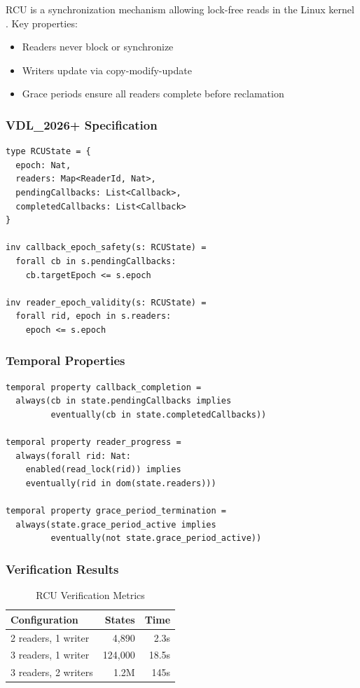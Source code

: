 \documentclass[conference]{IEEEtran}
\begin{document}
RCU is a synchronization mechanism allowing lock-free reads in the Linux kernel \cite{mckenney2013}. Key properties:
\begin{itemize}
\item Readers never block or synchronize
\item Writers update via copy-modify-update
\item Grace periods ensure all readers complete before reclamation
\end{itemize}

\subsubsection{VDL\_2026+ Specification}

\begin{lstlisting}[caption={RCU core types and invariants}]
type RCUState = {
  epoch: Nat,
  readers: Map<ReaderId, Nat>,
  pendingCallbacks: List<Callback>,
  completedCallbacks: List<Callback>
}

inv callback_epoch_safety(s: RCUState) =
  forall cb in s.pendingCallbacks:
    cb.targetEpoch <= s.epoch

inv reader_epoch_validity(s: RCUState) =
  forall rid, epoch in s.readers:
    epoch <= s.epoch
\end{lstlisting}

\subsubsection{Temporal Properties}

\begin{lstlisting}[caption={RCU liveness properties}]
temporal property callback_completion =
  always(cb in state.pendingCallbacks implies
         eventually(cb in state.completedCallbacks))

temporal property reader_progress =
  always(forall rid: Nat:
    enabled(read_lock(rid)) implies
    eventually(rid in dom(state.readers)))

temporal property grace_period_termination =
  always(state.grace_period_active implies
         eventually(not state.grace_period_active))
\end{lstlisting}

\subsubsection{Verification Results}

\begin{table}[h]
\centering
\caption{RCU Verification Metrics}
\begin{tabular}{lrr}
\toprule
\textbf{Configuration} & \textbf{States} & \textbf{Time} \\
\midrule
2 readers, 1 writer & 4,890 & 2.3s \\
3 readers, 1 writer & 124,000 & 18.5s \\
3 readers, 2 writers & 1.2M & 145s \\
\bottomrule
\end{tabular}
\end{table}
\end{document}
